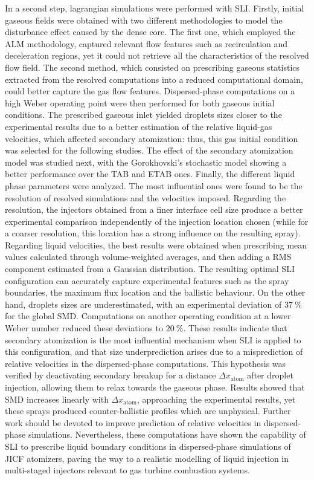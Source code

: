 In a second step, lagrangian simulations were performed with SLI. Firstly, initial gaseous fields were obtained with two different methodologies to model the disturbance effect caused by the dense core. The first one, which employed the ALM methodology, captured relevant flow features such as recirculation and deceleration regions, yet it could not retrieve all the characteristics of the resolved flow field. The second method, which consisted on prescribing gaseous statistics extracted from the resolved computations into a reduced computational domain, could better capture the gas flow features. Dispersed-phase computations on a high Weber operating point were then performed for both gaseous initial conditions. The prescribed gaseous inlet yielded droplets sizes closer to the experimental results due to a better estimation of the relative liquid-gas velocities, which affected secondary atomization: thus, this gas initial condition was selected for the following studies. The effect of the secondary atomization model was studied next, with the Gorokhovski's stochastic model showing a better performance over the TAB and ETAB ones. Finally, the different liquid phase parameters were analyzed. The most influential ones were found to be the resolution of resolved simulations and the velocities imposed. Regarding the resolution, the injectors obtained from a finer interface cell size produce a better experimental comparison independently of the injection location chosen (while for a coarser resolution, this location has a strong influence on the resulting spray). Regarding liquid velocities, the best results were obtained when prescribing mean values calculated through volume-weighted averages, and then adding a RMS component estimated from a Gaussian distribution. The resulting optimal SLI configuration can accurately capture experimental features such as the spray boundaries, the maximum flux location and the ballistic behaviour. On the other hand, droplets sizes are underestimated, with an experimental deviation of $37~\%$ for the global SMD. Computations on another operating condition at a lower Weber number reduced these deviations to $20~\%$. These results indicate that secondary atomization is the most influential mechanism when SLI is applied to this configuration, and that size underprediction arises due to a misprediction of relative velocities in the dispersed-phase computations. This hypothesis was verified by deactivating secondary breakup for a distance $\Delta x_\mathrm{atom}$ after droplet injection, allowing them to relax towards the gaseous phase. Results showed that SMD increases linearly with $\Delta x_\mathrm{atom}$, approaching the experimental results, yet these sprays produced counter-ballistic profiles which are unphysical. Further work should be devoted to improve prediction of relative velocities in dispersed-phase simulations. Nevertheless, these computations have shown the capability of SLI to prescribe liquid boundary conditions in dispersed-phase simulations of JICF atomizers, paving the way to a realistic modelling of liquid injection in multi-staged injectors relevant to gas turbine combustion systems.


